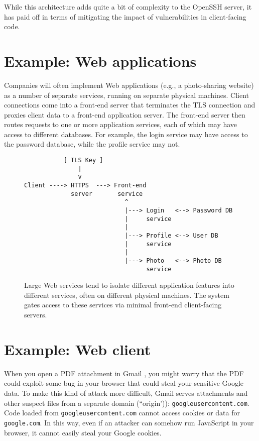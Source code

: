 While this architecture adds quite a bit of complexity to the OpenSSH
server, it has paid off in terms of mitigating the impact of vulnerabilities
in client-facing code.


\section{Example: Web applications}
Companies will often implement Web applications (e.g., a photo-sharing website)
as a number of separate services, running on separate physical machines.
Client connections come into a front-end server that terminates the TLS connection
and proxies client data to a front-end application server.
The front-end server then routes requests to one or more application
services, each of which may have access to different databases.
For example, the login service may have access to the password database,
while the profile service may not.

\begin{figure}
\begin{verbatim}
           [ TLS Key ]
               |                 
               v                  
Client ----> HTTPS  ---> Front-end 
             server       service
                            ^
                            |---> Login   <--> Password DB
                            |     service   
                            |
                            |---> Profile <--> User DB
                            |     service
                            |
                            |---> Photo   <--> Photo DB
                                  service
\end{verbatim}
\caption{Large Web services tend to isolate different application
  features into different services, often on different physical machines.
  The system gates access to these services via minimal front-end client-facing
  servers.}
\end{figure}

\section{Example: Web client}
When you open a PDF attachment in Gmail , you might
worry that the PDF could exploit some bug in your browser that could steal
your sensitive Google data.
To make this kind of attack more difficult, Gmail serves attachments
and other suspect files from a separate domain (``origin')): \texttt{googleusercontent.com}.
Code loaded from \texttt{googleusercontent.com} cannot access cookies
or data for \texttt{google.com}. In this way, even if an attacker can somehow
run JavaScript in your browser, it cannot easily steal your Google cookies.


